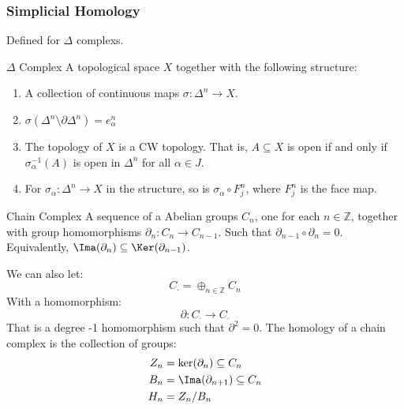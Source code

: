 \documentclass[crop=false,class=book,oneside]{standalone}
\begin{document}
            \subsubsection{Simplicial Homology}
                Defined for $\Delta$ complexs.
                \begin{ldefinition}{$\Delta$ Complex}
                    A topological space $X$ together with the
                    following structure:
                    \begin{enumerate}
                        \item A collection of continuous
                              maps $\sigma:\Delta^{n}\rightarrow{X}$.
                        \item $\sigma(\Delta^{n}\setminus%
                               \partial\Delta^{n})=e_{\alpha}^{n}$
                        \item The topology of $X$ is a CW topology.
                              That is, $A\subseteq{X}$ is open
                              if and only if
                              $\sigma_{\alpha}^{\minus{1}}(A)$ is
                              open in $\Delta^{n}$ for all
                              $\alpha\in{J}$.
                        \item For $\sigma_{\alpha}:%
                              \Delta^{n}\rightarrow{X}$ in the
                              structure, so is
                              $\sigma_{\alpha}\circ{F}_{j}^{n}$,
                              where $F_{j}^{n}$ is the face map.
                    \end{enumerate}
                \end{ldefinition}
                \begin{ldefinition}{Chain Complex}
                    A sequence of a Abelian groups
                    $C_{n}$, one for each $n\in\mathbb{Z}$,
                    together with group homomorphisms
                    $\partial_{n}:C_{n}\rightarrow{C}_{n-1}$.
                    Such that $\partial_{n-1}\circ\partial_{n}=0$.
                    Equivalently,
                    $\Ima(\partial_{n})\subseteq\Ker(\partial_{n-1})$.
                \end{ldefinition}
                We can also let:
                \begin{equation}
                    C_{\cdot}=\oplus_{n\in\mathbb{Z}}C_{n}
                \end{equation}
                With a homomorphism:
                \begin{equation}
                    \partial:C_{\cdot}\rightarrow{C}_{\cdot}
                \end{equation}
                That is a degree -1 homomorphism such that
                $\partial^{2}=0$. The homology of a chain
                complex is the collection of groups:
                \begin{align}
                    Z_{n}&=\ker(\partial_{n})\subseteq{C}_{n}\\
                    B_{n}&=\Ima(\partial_{n+1})\subseteq{C}_{n}\\
                    H_{n}&=Z_{n}/B_{n}
                \end{align}
\end{document}
